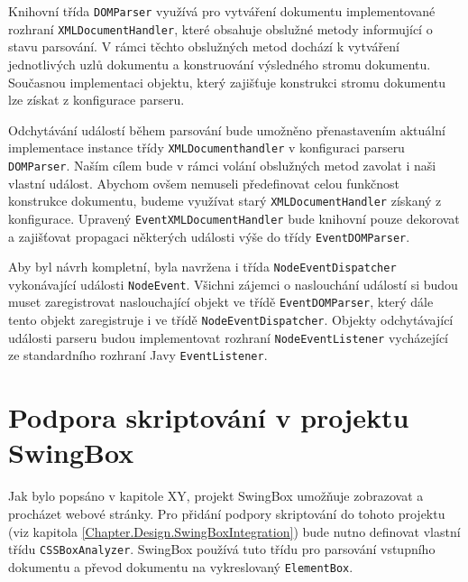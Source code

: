 Knihovní třída \texttt{DOMParser} využívá pro vytváření dokumentu implementované rozhraní \texttt{XMLDocumentHandler}, které obsahuje obslužné metody informující o stavu parsování. V rámci těchto obslužných metod dochází k vytváření jednotlivých uzlů dokumentu a konstruování výsledného stromu dokumentu. Současnou implementaci objektu, který zajišťuje konstrukci stromu dokumentu lze získat z konfigurace parseru.

Odchytávání událostí během parsování bude umožněno přenastavením aktuální implementace instance třídy \texttt{XMLDocumenthandler} v konfiguraci parseru \texttt{DOMParser}. Naším cílem bude v rámci volání obslužných metod zavolat i naši vlastní událost. Abychom ovšem nemuseli předefinovat celou funkčnost konstrukce dokumentu, budeme využívat starý \texttt{XMLDocumentHandler} získaný z konfigurace. Upravený \texttt{EventXMLDocumentHandler} bude knihovní pouze dekorovat a zajišťovat propagaci některých události výše do třídy \texttt{EventDOMParser}. 

Aby byl návrh kompletní, byla navržena i třída \texttt{NodeEventDispatcher} vykonávající události \texttt{NodeEvent}. Všichni zájemci o naslouchání událostí si budou muset zaregistrovat naslouchající objekt ve třídě \texttt{EventDOMParser}, který dále tento objekt zaregistruje i ve třídě \texttt{NodeEventDispatcher}. Objekty odchytávající události parseru budou implementovat rozhraní \texttt{NodeEventListener} vycházející ze standardního rozhraní Javy \texttt{EventListener}.

\section{Podpora skriptování v projektu SwingBox}
\label{Chapter.Design.ScriptsInSwingBox}

Jak bylo popsáno v kapitole XY, projekt SwingBox umožňuje zobrazovat a procházet webové stránky. Pro přidání podpory skriptování do tohoto projektu (viz kapitola \ref{Chapter.Design.SwingBoxIntegration}) bude nutno definovat vlastní třídu \texttt{CSSBoxAnalyzer}. SwingBox používá tuto třídu pro parsování vstupního dokumentu a převod dokumentu na vykreslovaný \texttt{ElementBox}.   

